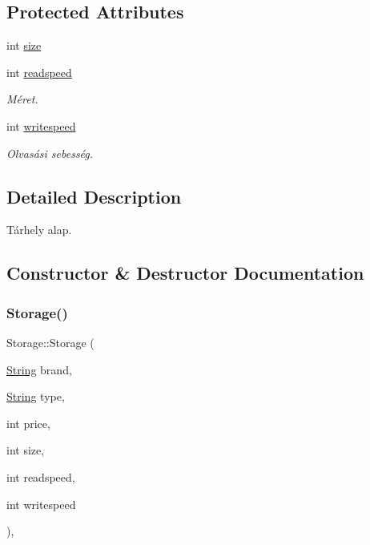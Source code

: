 \subsection*{Protected Attributes}
\begin{DoxyCompactItemize}
\item 
int \mbox{\hyperlink{class_storage_abcc80ce58a21fa884035617ee0b6cb67}{size}}
\item 
int \mbox{\hyperlink{class_storage_a41073842ff16961dad3903e6dd49bb0c}{readspeed}}
\begin{DoxyCompactList}\small\item\em Méret. \end{DoxyCompactList}\item 
int \mbox{\hyperlink{class_storage_a0198a1483ccf849d48c76da88599ba8b}{writespeed}}
\begin{DoxyCompactList}\small\item\em Olvasási sebesség. \end{DoxyCompactList}\end{DoxyCompactItemize}


\subsection{Detailed Description}
Tárhely alap. 

\subsection{Constructor \& Destructor Documentation}
\mbox{\label{class_storage_a502a2ec76e09d48a87da6ed1b91cdaa8}} 
\subsubsection{\texorpdfstring{Storage()}{Storage()}}
{\footnotesize\ttfamily Storage\+::\+Storage (\begin{DoxyParamCaption}\item[{\mbox{\hyperlink{class_string}{String}}}]{brand,  }\item[{\mbox{\hyperlink{class_string}{String}}}]{type,  }\item[{int}]{price,  }\item[{int}]{size,  }\item[{int}]{readspeed,  }\item[{int}]{writespeed }\end{DoxyParamCaption})\hspace{0.3cm}{\ttfamily [inline]}, {\ttfamily [explicit]}}



